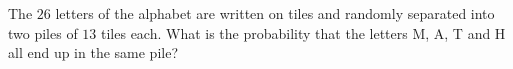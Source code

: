 The $26$ letters of the alphabet are written on tiles and randomly separated into two piles of $13$ tiles each. What is the probability that the letters M, A, T and H all end up in the same pile?
